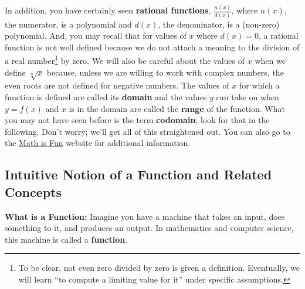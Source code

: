 In addition, you have certainly seen \textbf{rational functions}, $\frac{n(x)}{d(x)}$, where $n(x)$, the numerator, is a polynomial and $d(x)$, the denominator, is a (non-zero) polynomial. And, you may recall that for values of $x$ where $d(x) =0$, a rational function is not well defined because we do not attach a meaning to the division of a real number\footnote{To be clear, not even zero divided by zero is given a definition. Eventually, we will learn ``to compute a limiting value for it'' under specific assumptions.} by zero. We will also be careful about the values of $x$ when we define $\sqrt[n]{x}$ because, unless we are willing to work with complex numbers, the even roots are not defined for negative numbers. The values of $x$ for which a function is defined are called its \textbf{domain} and the values $y$ can take on when $y=f(x)$ and $x$ is in the domain are called the \textbf{range} of the function. What you may not have seen before is the term \textbf{codomain}; look for that in the following. Don't worry; we'll get all of this straightened out. You can also go to the \href{https://www.mathsisfun.com/sets/domain-range-codomain.html#:~:text=Codomain%20vs%20Range,that%20actually%20do%20come%20out.}{Math is Fun} website for additional information.



\subsection{Intuitive Notion of a Function and Related Concepts}

\textbf{What is a Function:} Imagine you have a machine that takes an input, does something to it, and produces an output. In mathematics and computer science, this machine is called a \textbf{function}.

